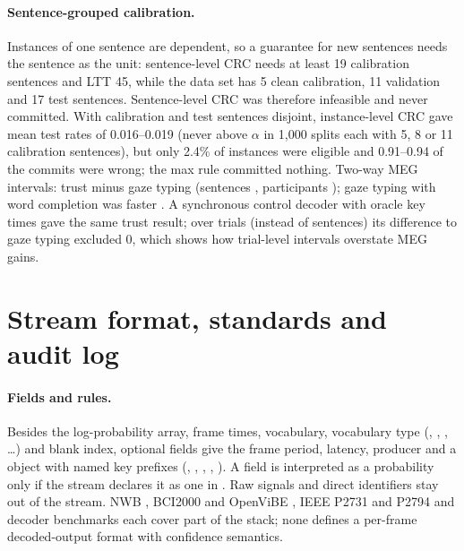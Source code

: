 \paragraph{Sentence-grouped calibration.} Instances of one sentence are dependent, so a guarantee for new sentences needs the sentence as the unit: sentence-level CRC needs at least 19 calibration sentences and LTT 45, while the data set has 5 clean calibration, 11 validation and 17 test sentences. Sentence-level CRC was therefore infeasible and never committed. With calibration and test sentences disjoint, instance-level CRC gave mean test rates of 0.016--0.019 (never above $\alpha$ in 1,000 splits each with 5, 8 or 11 calibration sentences), but only 2.4\% of instances were eligible and 0.91--0.94 of the commits were wrong; the max rule committed nothing. Two-way MEG intervals: trust minus gaze typing  (sentences , participants ); gaze typing with word completion was faster . A synchronous control decoder with oracle key times gave the same trust result; over trials (instead of sentences) its difference to gaze typing excluded 0, which shows how trial-level intervals overstate MEG gains.

\section{Stream format, standards and audit log}
\label{app:format}

\paragraph{Fields and rules.} Besides the log-probability array, frame times, vocabulary, vocabulary type (, , , \ldots) and blank index, optional fields give the frame period, latency, producer and a  object with named key prefixes (, , , , ). A field is interpreted as a probability only if the stream declares it as one in . Raw signals and direct identifiers stay out of the stream. NWB \citep{rubel2022nwb}, BCI2000 and OpenViBE \citep{schalk2004bci2000,renard2010openvibe}, IEEE P2731 and P2794 \citep{ieeep2731,ieeep2794,eiber2021reporting} and decoder benchmarks \citep{jayaram2018moabb,banville2026neuralbench} each cover part of the stack; none defines a per-frame decoded-output format with confidence semantics.

